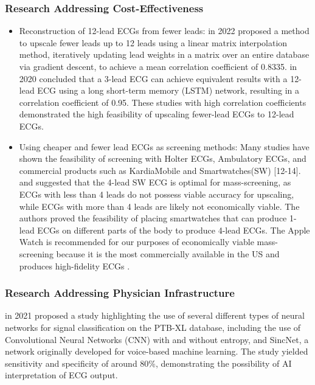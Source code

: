 \documentclass[
	a4paper, 
	10pt, 
	twoside, 
]{LTJournalArticle}
\begin{document}
\subsubsection{Research Addressing Cost-Effectiveness}
\begin{itemize}
    \item Reconstruction of 12-lead ECGs from fewer leads: \textcite{Jain2022} in 2022 proposed a method to upscale fewer leads up to 12 leads using a linear matrix interpolation method, iteratively updating lead weights in a matrix over an entire database via gradient descent, to achieve a mean correlation coefficient of 0.8335. \textcite{Sohn2020} in 2020 concluded that a 3-lead ECG can achieve equivalent results with a 12-lead ECG using a long short-term memory (LSTM) network, resulting in a correlation coefficient of 0.95. These studies with high correlation coefficients demonstrated the high feasibility of upscaling fewer-lead ECGs to 12-lead ECGs.
    \item Using cheaper and fewer lead ECGs as screening methods: Many studies have shown the feasibility of screening with Holter ECGs, Ambulatory ECGs, and commercial products such as KardiaMobile and Smartwatches(SW) [12-14]. \textcite{Touiti2023} and \textcite{Behzadi2020} suggested that the 4-lead SW ECG is optimal for mass-screening, as ECGs with less than 4 leads do not possess viable accuracy for upscaling, while ECGs with more than 4 leads are likely not economically viable. The authors proved the feasibility of placing smartwatches that can produce 1-lead ECGs on different parts of the body to produce 4-lead ECGs. The Apple Watch is recommended for our purposes of economically viable mass-screening because it is the most commercially available in the US and produces high-fidelity ECGs \cite{Pepplinkhuizen2022}.
\end{itemize}

\subsubsection{Research Addressing Physician Infrastructure}
\textcite{Smigiel2021} in 2021 proposed a study highlighting the use of several different types of neural networks for signal classification on the PTB-XL database, including the use of Convolutional Neural Networks (CNN) with and without entropy, and SincNet, a network originally developed for voice-based machine learning. The study yielded sensitivity and specificity of around 80\%, demonstrating the possibility of AI interpretation of ECG output. 
\end{document}
